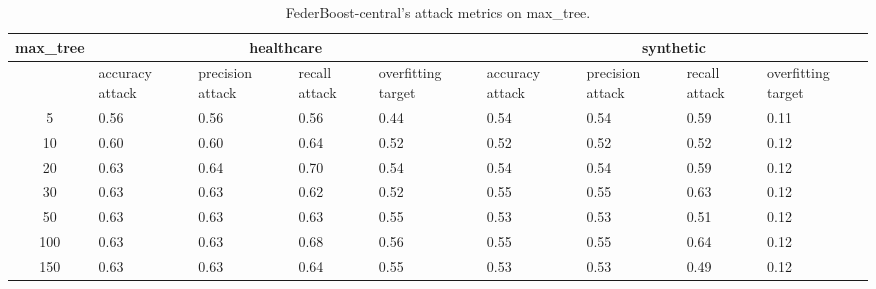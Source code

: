 \begin{table*}[]\centering
\begin{tabular}{|c| *{8}{m{1.0cm}|}}
\hline\rowcolor{gray!50}
\cellcolor{gray!80} max_tree & \multicolumn{4}{c|}{healthcare} & \multicolumn{4}{c|}{synthetic}\\\hline 
& accuracy attack & precision attack & recall attack & overfitting target & accuracy attack & precision attack & recall attack & overfitting target\\\hline
5 & 0.56 & 0.56 & 0.56 & 0.44 & 0.54 & 0.54 & 0.59 & 0.11\\ \hline
10 & 0.60 & 0.60 & 0.64 & 0.52 & 0.52 & 0.52 & 0.52 & 0.12\\ \hline
20 & 0.63 & 0.64 & 0.70 & 0.54 & 0.54 & 0.54 & 0.59 & 0.12\\ \hline
30 & 0.63 & 0.63 & 0.62 & 0.52 & 0.55 & 0.55 & 0.63 & 0.12\\ \hline
50 & 0.63 & 0.63 & 0.63 & 0.55 & 0.53 & 0.53 & 0.51 & 0.12\\ \hline
100 & 0.63 & 0.63 & 0.68 & 0.56 & 0.55 & 0.55 & 0.64 & 0.12\\ \hline
150 & 0.63 & 0.63 & 0.64 & 0.55 & 0.53 & 0.53 & 0.49 & 0.12\\ \hline
\end{tabular} 
\caption{FederBoost-central's attack metrics on max_tree.}
\label{tab:experiment1_max_tree}
\end{table*}
